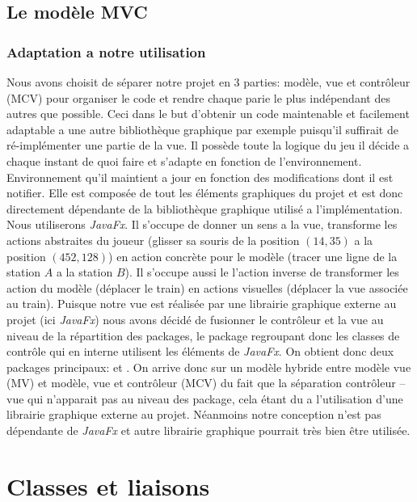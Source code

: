 \documentclass[report, backcover, french, nodocumentinfo]{upmethodology-document}
\begin{document}
		\section{Le modèle MVC}
			\subsection{Adaptation a notre utilisation}
					Nous avons choisit de séparer notre projet en 3 parties: modèle, vue et contrôleur (MCV) pour organiser le code et rendre chaque parie le plus indépendant des autres que possible. Ceci dans le but d'obtenir un code maintenable et facilement adaptable a une autre bibliothèque graphique par exemple puisqu'il suffirait de ré-implémenter une partie de la vue.
					Il possède toute la logique du jeu il décide a chaque instant de quoi faire et s'adapte en fonction de l’environnement. Environnement qu'il maintient a jour en fonction des modifications dont il est notifier.
					Elle est composée de tout les éléments graphiques du projet et est donc directement dépendante de la bibliothèque graphique utilisé a l'implémentation. Nous utiliserons \textit{JavaFx}.
					Il s'occupe de donner un sens a la vue, transforme les actions abstraites du joueur (glisser sa souris de la position $(14,35)$ a la position $(452,128)$) en action concrète pour le modèle (tracer une ligne de la station $A$ a la station $B$). Il s’occupe aussi le l'action inverse de transformer les action du modèle (déplacer le train) en actions visuelles (déplacer la vue associée au train).
					Puisque notre vue est réalisée par une librairie graphique externe au projet (ici \textit{JavaFx}) nous avons décidé de fusionner le contrôleur et la vue au niveau de la répartition des packages, le package  regroupant donc les classes de contrôle qui en interne utilisent les éléments de \textit{JavaFx}. On obtient donc deux packages principaux:  et .
				\p{}
					On arrive donc sur un modèle hybride entre modèle vue (MV) et modèle, vue et contrôleur (MCV) du fait que la séparation contrôleur -- vue qui n'apparait pas au niveau des package, cela étant du a l'utilisation d'une librairie graphique externe au projet. Néanmoins notre conception n'est pas dépendante de \textit{JavaFx} et autre librairie graphique pourrait très bien être utilisée.

	\chapter{Classes et liaisons}
\end{document}
